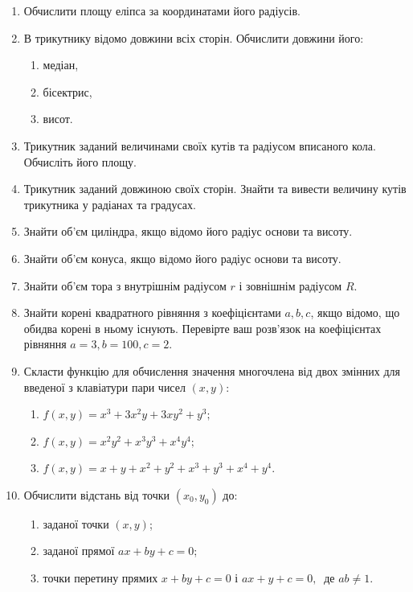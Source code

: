 \documentclass[a5paper,titlepage,openany,twoside,
]
{book_unv}%
\makeatletter
\newcommand{\xslalph}[1]{\expandafter\@xslalph\csname c@#1\endcsname}
\newcommand{\@xslalph}[1]{%
    \ifcase#1\or а\or б\or в\or г\or д\or e\or є\or ж\or з\or i%
    \or й\or к\or л\or м\or н\or о\or п\or р\or с\or т%
    \or у\or ф\or х\or ц\or ч\or ш\or ю\or я\or аа\or бб\or вв%
    \else\@ctrerr\fi%
}
\makeatother
\begin{document}
\begin{enumerate}
\def\labelenumi{\arabic{enumi})}
\setcounter{enumi}{6}
\item
  Обчислити площу еліпса за координатами його радіусів.
\item
  В трикутнику відомо довжини всіх сторін. Обчислити довжини його:
  \begin{enumerate}[label=\xslalph*)]
   \item
    медіан,
   \item
    бісектрис,
    \item
    висот.
  \end{enumerate}
\item
  Трикутник заданий величинами своїх кутів та радіусом вписаного кола.
  Обчисліть його площу.
\item
  Трикутник заданий довжиною своїх сторін. Знайти та вивести величину
  кутів трикутника у радіанах та градусах.
\item
  Знайти об'єм циліндра, якщо відомо його радіус основи та висоту.
\item
  Знайти об'єм конуса, якщо відомо його радіус основи та висоту.
\item
  Знайти об'єм тора з внутрішнім радіусом \(r\) і зовнішнім радіусом
  \(R\).
\item
  Знайти корені квадратного рівняння з коефіцієнтами \(a,b,c\), якщо відомо,
  що обидва корені в ньому існують. Перевірте ваш розв'язок на
  коефіцієнтах рівняння \(a=3,b=100,c=2\).
\item
  Скласти функцію для обчислення значення многочлена від двох змінних
  для введеної з клавіатури пари чисел \((x,y)\):
  \begin{enumerate}[label=\xslalph*)]
    \item
    \(f(x,y) = x^{3} + 3x^{2}y + 3xy^{2} + y^{3};\)
    \item
    \(f(x,y) = x^{2}y^{2} + x^{3}y^{3} + x^{4}y^{4};\)
    \item
    \(f(x,y) = x + y + x^{2} + y^{2} + x^{3} + y^{3} + x^{4} + y^{4}\).
  \end{enumerate}

\item
  Обчислити відстань від точки \((x_{0},y_{0})\) до:
\begin{enumerate}[label=\xslalph*)]
\item заданої точки \((x,y)\);
\item заданої прямої \(ax + by + c = 0\);
\item точки перетину прямих \(x + by + c = 0\) і
\(ax + y + c = 0,\ \) де 
\(ab \neq 1\).
\end{enumerate}


\end{enumerate}
\end{document}
